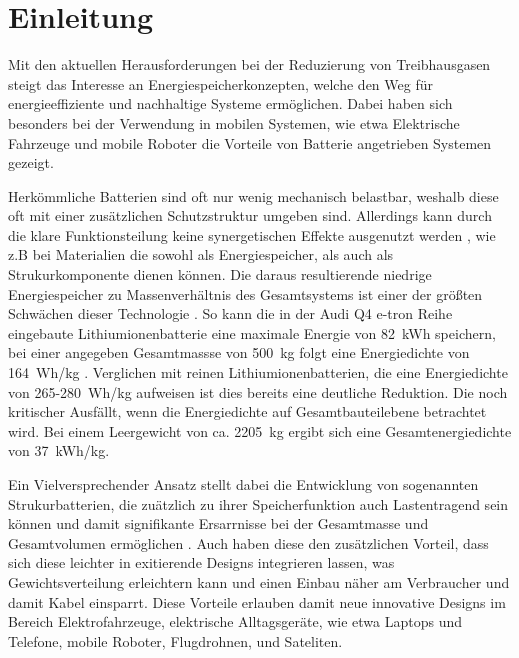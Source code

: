 \chapter[Einleitung]{\label{sec:Einleitung}Einleitung}
Mit den aktuellen Herausforderungen bei der Reduzierung von Treibhausgasen steigt das Interesse an Energiespeicherkonzepten, welche den Weg für energieeffiziente und nachhaltige Systeme ermöglichen. Dabei haben sich besonders bei der Verwendung in mobilen Systemen, wie etwa Elektrische Fahrzeuge \cite{Huo2015, Donateo2015,Jochem2015,Kim2014,Orsi2016,Silva2011,Holdway2010,Sternberg2015,Ramachandran2015} und mobile Roboter \cite{Hecht2023,Mikolajczyk2023,Ghobadpour2023,Wang2020} die Vorteile von Batterie angetrieben Systemen gezeigt.

Herkömmliche Batterien sind oft nur wenig mechanisch belastbar, weshalb diese oft mit einer zusätzlichen Schutzstruktur umgeben sind. Allerdings kann durch die klare Funktionsteilung keine synergetischen Effekte ausgenutzt werden , wie z.B bei Materialien die sowohl als Energiespeicher, als auch als Strukurkomponente dienen können. Die daraus resultierende niedrige Energiespeicher zu Massenverhältnis des Gesamtsystems ist einer der größten Schwächen dieser Technologie \cite{Armand2020,Schaefer2018, Cano2018,Goodenough2009}. 
So kann die in der Audi Q4 e-tron Reihe eingebaute Lithiumionenbatterie eine maximale Energie von 82~kWh speichern, bei einer angegeben Gesamtmassse von 500~kg folgt eine Energiedichte von 164~Wh/kg \cite{Radu2021,Audi2022}. Verglichen mit reinen Lithiumionenbatterien, die eine Energiedichte von 265-280~Wh/kg \cite{Armand2020} aufweisen ist dies bereits eine deutliche Reduktion. Die noch kritischer Ausfällt, wenn die Energiedichte auf Gesamtbauteilebene betrachtet wird. Bei einem Leergewicht von ca. 2205~kg \cite{Audi2022} ergibt sich eine Gesamtenergiedichte von 37~kWh/kg.

Ein Vielversprechender Ansatz stellt dabei die Entwicklung von sogenannten Strukurbatterien, die zuätzlich zu ihrer Speicherfunktion auch Lastentragend sein können \cite{Johannisson2018, Danzi2021, Wetzel2004, Thomas2004, Liu2009, Ekstedt2010, Wang2019, Asp2019, Moyer2020, Zhao2020, Yin2020, Wang2020, Lutkenhaus2020, Fu2021, Jin2021, Kalnaus2021, Wong2007, Carlson2013, Xu2022} und damit signifikante Ersarrnisse bei der Gesamtmasse und Gesamtvolumen ermöglichen \cite{Wetzel2004, Snyder2015, Carlstedt2020a, Asp2014, Johannisson2019}. Auch haben diese den zusätzlichen Vorteil, dass sich diese leichter in exitierende Designs integrieren lassen, was Gewichtsverteilung erleichtern kann und einen Einbau näher am Verbraucher und damit Kabel einsparrt. Diese Vorteile erlauben damit neue innovative Designs im Bereich Elektrofahrzeuge, elektrische Alltagsgeräte, wie etwa Laptops und Telefone, mobile Roboter, Flugdrohnen, und Sateliten.

